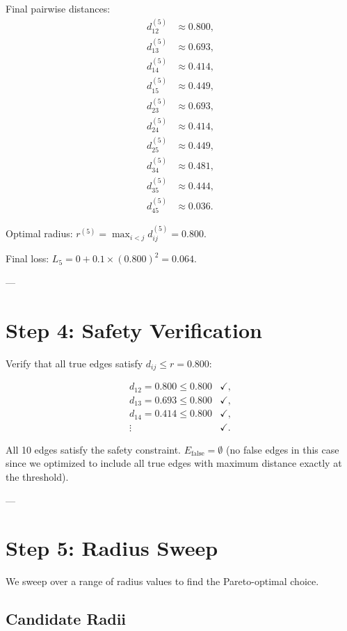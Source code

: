 \documentclass[11pt]{article}
\theoremstyle{definition}
\newcommand{\Efalse}{E_{\mathrm{false}}}
\begin{document}
Final pairwise distances:
\begin{align*}
d_{12}^{(5)} &\approx 0.800,\\
d_{13}^{(5)} &\approx 0.693,\\
d_{14}^{(5)} &\approx 0.414,\\
d_{15}^{(5)} &\approx 0.449,\\
d_{23}^{(5)} &\approx 0.693,\\
d_{24}^{(5)} &\approx 0.414,\\
d_{25}^{(5)} &\approx 0.449,\\
d_{34}^{(5)} &\approx 0.481,\\
d_{35}^{(5)} &\approx 0.444,\\
d_{45}^{(5)} &\approx 0.036.
\end{align*}

Optimal radius: $r^{(5)} = \max_{i<j} d_{ij}^{(5)} = 0.800$.

Final loss: $L_5 = 0 + 0.1 \times (0.800)^2 = 0.064$.

---

\section{Step 4: Safety Verification}

Verify that all true edges satisfy $d_{ij} \le r = 0.800$:

\[
\begin{array}{ll}
d_{12} = 0.800 \le 0.800 & \checkmark,\\
d_{13} = 0.693 \le 0.800 & \checkmark,\\
d_{14} = 0.414 \le 0.800 & \checkmark,\\
\vdots & \checkmark.
\end{array}
\]

All 10 edges satisfy the safety constraint. $\Efalse = \emptyset$ (no false edges in this case since we optimized to include all true edges with maximum distance exactly at the threshold).

---

\section{Step 5: Radius Sweep}

We sweep over a range of radius values to find the Pareto-optimal choice.

\subsection{Candidate Radii}
\end{document}
